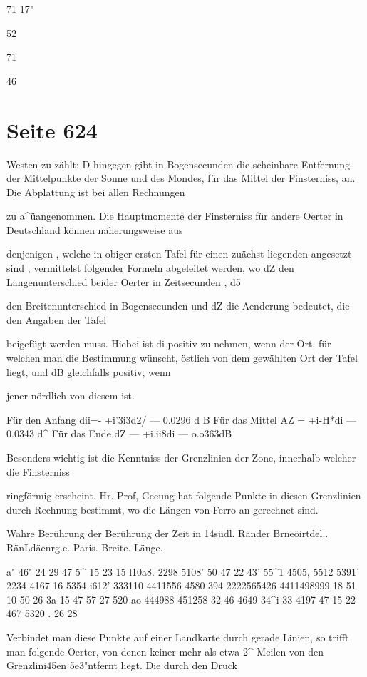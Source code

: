 \documentclass[10pt,a4paper]{article}
\begin{document}
71 17"

52

71

46


\newpage
\section*{Seite 624}
Westen zu zählt; D hingegen gibt in Bogensecunden die scheinbare Entfernung der Mittelpunkte der Sonne und des Mondes, für das Mittel der Finsterniss, an. Die Abplattung ist bei allen Rechnungen

zu a\textasciicircum{}üangenommen. Die Hauptmomente der Finsterniss für andere Oerter in Deutschland können näherungsweise aus

denjenigen , welche in obiger ersten Tafel für einen zuächst liegenden angesetzt sind , vermittelst folgender Formeln abgeleitet werden, wo dZ den Längenunterschied beider Oerter in Zeitsecunden , d5

den Breitenunterschied in Bogensecunden und dZ die Aenderung bedeutet, die den Angaben der Tafel

beigefügt werden muss. Hiebei ist di positiv zu nehmen, wenn der Ort, für welchen man die Bestimmung wünscht, östlich von dem gewählten Ort der Tafel liegt, und dB gleichfalls positiv, wenn

jener nördlich von diesem ist.

Für den Anfang dii=- +i'3i3d2/ — 0.0296 d B Für das Mittel AZ = +i-H*di — 0.0343 d\textasciicircum{} Für das Ende dZ — +i.ii8di — o.o363dB

Besonders wichtig ist die Kenntniss der Grenzlinien der Zone, innerhalb welcher die Finsterniss

ringförmig erscheint. Hr. Prof, Geeung hat folgende Punkte in diesen Grenzlinien durch Rechnung bestimmt, wo die Längen von Ferro an gerechnet sind.

Wahre Berührung der Berührung der Zeit in 14südl. Ränder Brneöirtdel.. RänLdäenrg.e. Paris. Breite. Länge.

a" 46" 24 29 47 5\textasciicircum{} 15 23 15 l10a8. 2298\textdegree{} 5108' 50 47 22\textdegree{} 43' 55\textasciicircum{}1 4505, 5512\textdegree{} 5391' 2234 4167 16 5354\textdegree{} i612' 333110 4411556 4580 394 2222565426 4411498999 18 51 10 50 26 3a 15 47 57 27 520 ao 444988 451258 32 46 4649 34\textasciicircum{}i 33 4197 47 15 22 467 5320 . 26 28

Verbindet man diese Punkte auf einer Landkarte durch gerade Linien, so trifft man folgende Oerter, von denen keiner mehr als etwa 2\textasciicircum{} Meilen von den Grenzlini45en 5e3"ntfernt liegt. Die durch den Druck
\end{document}

